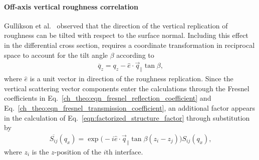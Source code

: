 \paragraph{Off-axis vertical roughness correlation}
Gullikson et al.~\cite{gullikson_asymmetric_1999} observed that the direction of the vertical replication of roughness can be tilted with respect to the surface normal. Including this effect in the differential cross section, requires a coordinate transformation in reciprocal space to account for the tilt angle $\beta$ according to
\begin{align}
\overline{q}_z = q_z - \hat{e} \cdot \vec{q}_\parallel   \tan \beta\text{,}
\end{align}
where $\hat{e}$ is a unit vector in direction of the roughness replication. Since the vertical scattering vector components enter the calculations through the Fresnel coefficients in Eq.~\eqref{ch_theo:eqn_fresnel_reflection_coefficient} and Eq.~\eqref{ch_theo:eqn_fresnel_transmission_coefficient}, an additional factor appears in the calculation of Eq.~\eqref{eqn:factorized_structure_factor} through substitution by
\begin{align}
\overline{S_{ij}}(q_x) = \exp\Big(-i \hat{e} \cdot \vec{q}_\parallel \tan \beta (z_i-z_j)\Big)  S_{ij}(q_x) \text{,} \label{eqn:tilt_correction}
\end{align}
where $z_i$ is the $z$-position of the $i$th interface.

